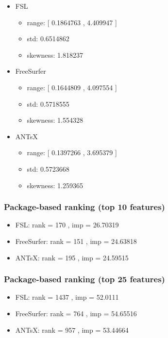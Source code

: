\documentclass[
  10pt,
]{article}
\begin{document}
\begin{itemize}
\item
  FSL

  \begin{itemize}
  \item
    range: {[} 0.1864763 , 4.409947 {]}
  \item
    std: 0.6514862
  \item
    skewness: 1.818237
  \end{itemize}
\item
  FreeSurfer

  \begin{itemize}
  \item
    range: {[} 0.1644809 , 4.097554 {]}
  \item
    std: 0.5718555
  \item
    skewness: 1.554328
  \end{itemize}
\item
  ANTsX

  \begin{itemize}
  \item
    range: {[} 0.1397266 , 3.695379 {]}
  \item
    std: 0.5723668
  \item
    skewness: 1.259365
  \end{itemize}
\end{itemize}

\hypertarget{package-based-ranking-top-10-features-1}{%
\subsubsection{Package-based ranking (top 10
features)}\label{package-based-ranking-top-10-features-1}}

\begin{itemize}
\item
  FSL: rank = 170 , imp = 26.70319
\item
  FreeSurfer: rank = 151 , imp = 24.63818
\item
  ANTsX: rank = 195 , imp = 24.59515
\end{itemize}

\hypertarget{package-based-ranking-top-25-features-1}{%
\subsubsection{Package-based ranking (top 25
features)}\label{package-based-ranking-top-25-features-1}}

\begin{itemize}
\item
  FSL: rank = 1437 , imp = 52.0111
\item
  FreeSurfer: rank = 764 , imp = 54.65516
\item
  ANTsX: rank = 957 , imp = 53.44664
\end{itemize}
\end{document}

